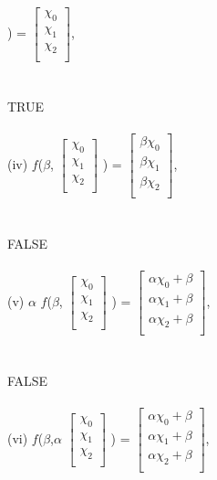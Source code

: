 \documentclass[11pt]{article}
\begin{document}
)
=
$
\begin{bmatrix}
{\chi_{0}}\\
{\chi_{1}}\\
{\chi_{2}}\\
\end{bmatrix}$,
\\
\\
\\
TRUE
\\
\\
(iv)
$f$($\beta$,
$
\begin{bmatrix}
{\chi_{0}}\\
{\chi_{1}}\\
{\chi_{2}}\\
\end{bmatrix}$
)
=
$
\begin{bmatrix}
{\beta\chi_{0}}\\
{\beta\chi_{1}}\\
{\beta\chi_{2}}\\
\end{bmatrix}$,
\\
\\
\\
FALSE
\\
\\
(v)
$\alpha$ $f$($\beta$,
$
\begin{bmatrix}
{\chi_{0}}\\
{\chi_{1}}\\
{\chi_{2}}\\
\end{bmatrix}$
)
=
$
\begin{bmatrix}
{\alpha\chi_{0} + \beta}\\
{\alpha\chi_{1} + \beta}\\
{\alpha\chi_{2} + \beta}\\
\end{bmatrix}$,
\\
\\
\\
FALSE
\\
\\
(vi)
$f$($\beta$,$\alpha$
$
\begin{bmatrix}
{\chi_{0}}\\
{\chi_{1}}\\
{\chi_{2}}\\
\end{bmatrix}$
)
=
$
\begin{bmatrix}
{\alpha\chi_{0} + \beta}\\
{\alpha\chi_{1} + \beta}\\
{\alpha\chi_{2} + \beta}\\
\end{bmatrix}$,
\end{document}
